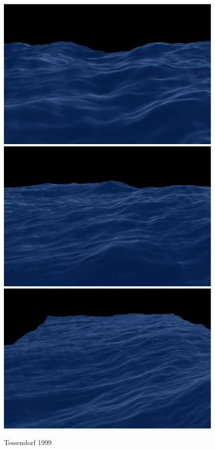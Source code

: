 \begin{figure}
 \centering
 \subtop
 {
  \includegraphics[scale=0.145]{figures/Simulating_Ocean_Water-008.png}
 }
 \hfill
 \subtop
 {
  \includegraphics[scale=0.145]{figures/Simulating_Ocean_Water-009.png}
 }
 \hfill
 \subtop
 {
  \includegraphics[scale=0.145]{figures/Simulating_Ocean_Water-010.png}
 }
 \caption{Tessendorf 1999}
\end{figure}